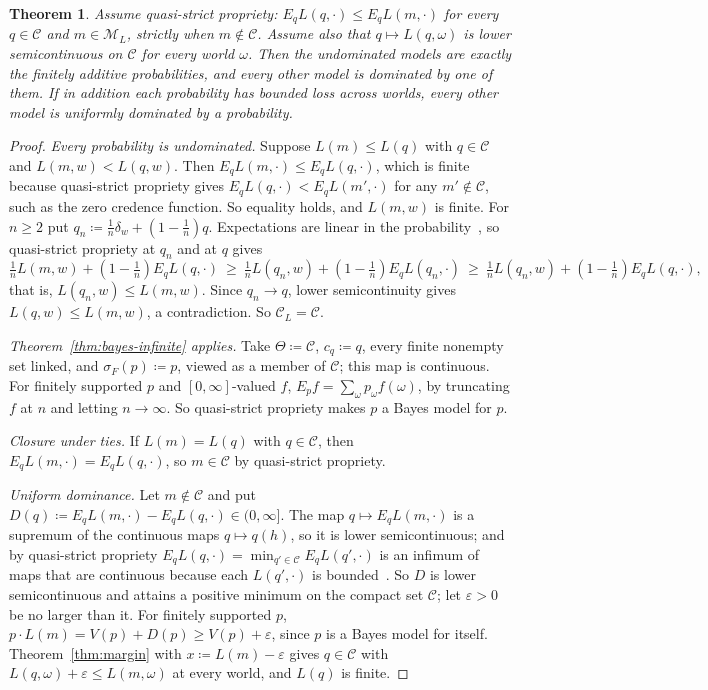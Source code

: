 \documentclass[11pt]{article}
\newtheorem{theorem}{Theorem}[section]
\theoremstyle{definition}
\theoremstyle{remark}
\newcommand{\M}{\mathcal M}
\newcommand{\C}{\mathcal C}
\begin{document}
\begin{theorem}\label{thm:nielsen}
Assume \emph{quasi-strict propriety}: $E_qL(q,\cdot)\le E_qL(m,\cdot)$ for every $q\in\C$ and $m\in\M_L$, strictly when $m\notin\C$. Assume also that $q\mapsto L(q,\omega)$ is lower semicontinuous on $\C$ for every world $\omega$. Then the undominated models are exactly the finitely additive probabilities, and every other model is dominated by one of them. If in addition each probability has bounded loss across worlds, every other model is uniformly dominated by a probability.
\end{theorem}
\begin{proof}
\emph{Every probability is undominated.} Suppose $L(m)\le L(q)$ with $q\in\C$ and $L(m,w)<L(q,w)$. Then $E_qL(m,\cdot)\le E_qL(q,\cdot)$, which is finite because quasi-strict propriety gives $E_qL(q,\cdot)<E_qL(m',\cdot)$ for any $m'\notin\C$, such as the zero credence function. So equality holds, and $L(m,w)$ is finite. For $n\ge2$ put $q_n\coloneqq\frac1n\delta_w+(1-\frac1n)q$. Expectations are linear in the probability~\cite[Appendix~A, Proposition~1]{Nielsen}, so quasi-strict propriety at $q_n$ and at $q$ gives
\[
\tfrac1nL(m,w)+(1-\tfrac1n)E_qL(q,\cdot)\ \ge\ \tfrac1nL(q_n,w)+(1-\tfrac1n)E_qL(q_n,\cdot)\ \ge\ \tfrac1nL(q_n,w)+(1-\tfrac1n)E_qL(q,\cdot),
\]
that is, $L(q_n,w)\le L(m,w)$. Since $q_n\to q$, lower semicontinuity gives $L(q,w)\le L(m,w)$, a contradiction. So $\C_L=\C$.

\emph{Theorem~\ref{thm:bayes-infinite} applies.} Take $\Theta\coloneqq\C$, $c_q\coloneqq q$, every finite nonempty set linked, and $\sigma_F(p)\coloneqq p$, viewed as a member of $\C$; this map is continuous. For finitely supported $p$ and $[0,\infty]$-valued $f$, $E_pf=\sum_\omega p_\omega f(\omega)$, by truncating $f$ at $n$ and letting $n\to\infty$. So quasi-strict propriety makes $p$ a Bayes model for $p$.

\emph{Closure under ties.} If $L(m)=L(q)$ with $q\in\C$, then $E_qL(m,\cdot)=E_qL(q,\cdot)$, so $m\in\C$ by quasi-strict propriety.

\emph{Uniform dominance.} Let $m\notin\C$ and put $D(q)\coloneqq E_qL(m,\cdot)-E_qL(q,\cdot)\in(0,\infty]$. The map $q\mapsto E_qL(m,\cdot)$ is a supremum of the continuous maps $q\mapsto q(h)$, so it is lower semicontinuous; and by quasi-strict propriety $E_qL(q,\cdot)=\min_{q'\in\C}E_qL(q',\cdot)$ is an infimum of maps that are continuous because each $L(q',\cdot)$ is bounded~\cite[Lemmas~1 and~3]{Nielsen}. So $D$ is lower semicontinuous and attains a positive minimum on the compact set $\C$; let $\varepsilon>0$ be no larger than it. For finitely supported $p$, $p\cdot L(m)=V(p)+D(p)\ge V(p)+\varepsilon$, since $p$ is a Bayes model for itself. Theorem~\ref{thm:margin} with $x\coloneqq L(m)-\varepsilon$ gives $q\in\C$ with $L(q,\omega)+\varepsilon\le L(m,\omega)$ at every world, and $L(q)$ is finite.
\end{proof}
\end{document}
